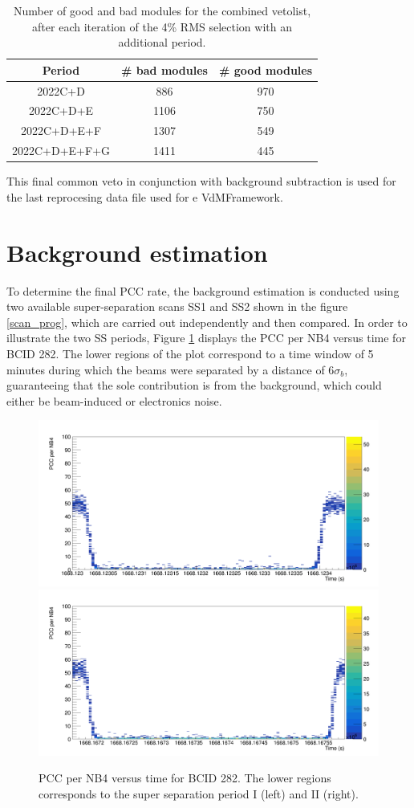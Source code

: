 \begin{table}[h!]
\centering
\caption{Number of good and bad modules for the combined vetolist, after each iteration of the 4\% RMS selection with an additional period.}
\begin{tabular}{ccc}
\textbf{Period} & \textbf{\# bad modules} & \textbf{\# good modules}  \\ 
\toprule
2022C+D         & 886                     & 970                       \\
2022C+D+E       & 1106                    & 750                       \\
2022C+D+E+F     & 1307                    & 549                       \\
2022C+D+E+F+G   & 1411                    & 445                   
\label{common  veto module}   
\end{tabular}
\end{table}

\noindent This final common veto in conjunction with background subtraction  is used for the last reprocesing data file used for e VdMFramework.  

\section{Background estimation}

To determine the final PCC rate, the background estimation is conducted using two available super-separation scans SS1 and SS2 shown in the figure \ref{scan_prog}, which are carried out independently and then compared. In order to illustrate the two SS periods, Figure \ref{ssp_wide_bx282} displays the PCC per NB4 versus time for BCID 282. The lower regions of the plot correspond to a time window of 5 minutes during which the beams were separated by a distance of $6\sigma_{b}$, guaranteeing that the sole contribution is from the background, which could either be beam-induced or electronics noise.

\begin{center}
\begin{figure}[h!]
\centering
\includegraphics[width=.49\textwidth]{Chapter4/BX_282_Rates_SS1.png}
\includegraphics[width=.49\textwidth]{Chapter4/BX_282_Rates_SS2.png}
\caption[Super Separation periods for BCID 282]{PCC per NB4 versus time for BCID 282. The lower regions corresponds to the super separation period I (left) and II (right).}
\label{ssp_wide_bx282}
\end{figure}
\end{center}
\\


